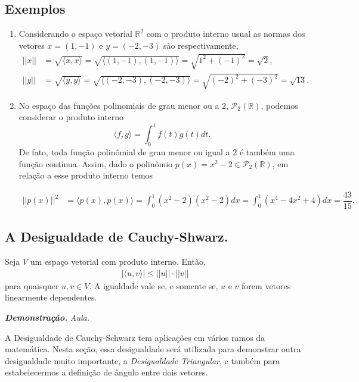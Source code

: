 \subsection{Exemplos}
\begin{enumerate}


\item   Considerando o espaço vetorial $\mathbb{R}^2$ com o produto interno usual as normas dos vetores  $x=(1,-1)$ e $y=(-2,-3)$ são respectivamente,
\begin{align*}
 ||x||&= \sqrt{\langle x, x \rangle }= \sqrt{\langle (1,-1), (1,-1) \rangle } = \sqrt{1^2+(-1)^2} = \sqrt{2},\\
||y||&= \sqrt{\langle y, y\rangle }= \sqrt{\langle (-2,-3), (-2,-3) \rangle } = \sqrt{(-2)^2+(-3)^2} = \sqrt{13}.
\end{align*}


\item No espaço das funções polinomiais de grau menor ou a 2,  $\mathcal{P}_2(\mathbb{R})$,  podemos considerar  o produto interno
 $$\langle f, g \rangle = \int_{0}^{1}f(t)g(t)dt.$$  De fato, toda função polinômial de grau menor ou igual a 2 é também uma função contínua. Assim, dado o polinômio $p(x)=x^2-2 \in\mathcal{P}_2(\mathbb{R})$, em relação a esse produto interno temos

\begin{align*}
 ||p(x)||^2&= \langle p(x), p(x) \rangle = \int_{0}^{1}(x^2-2)( x^2-2)dx= \int_{0}^{1}(x^4-4x^2+4)dx=\dfrac{43}{15}.
\end{align*}

\end{enumerate}

\vspace{0.7cm}

\subsection {\textbf{A Desigualdade de Cauchy-Shwarz.}}
Seja $V$ um espaço vetorial com produto interno. Então,
\begin{align}
|\langle u, v\rangle| \leq ||u||\cdot ||v|| \end{align} para quaisquer $u, v \in V$. A igualdade vale se, e somente se, $u$ e $v$ forem vetores linearmente dependentes.

\textbf{\textit{Demonstração.}} \textit{Aula.}

\vspace{0.7cm}

A Desigualdade de Cauchy-Schwarz tem aplicações em vários ramos da matemática. Nesta seção, essa desigualdade será utilizada para demonstrar outra desigualdade muito importante, a \textit{Desigualdade Triangular}, e também para estabelecermos a definição de ângulo entre dois vetores.



